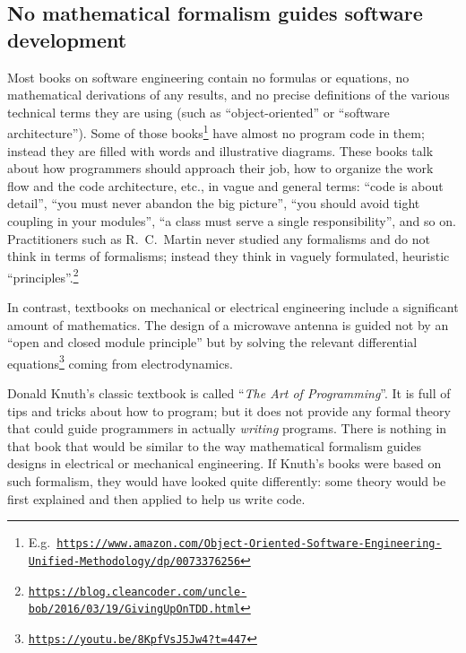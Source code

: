 \subsection{No mathematical formalism guides software development}

Most books on software engineering contain no formulas or equations,
no mathematical derivations of any results, and no precise definitions
of the various technical terms they are using (such as ``object-oriented''
or ``software architecture''). Some of those books\footnote{E.g.~\texttt{\href{https://www.amazon.com/Object-Oriented-Software-Engineering-Unified-Methodology/dp/0073376256}{https://www.amazon.com/Object-Oriented-Software-Engineering-Unified-Methodology/dp/0073376256}}}
have almost no program code in them; instead they are filled with
words and illustrative diagrams. These books talk about how programmers
should approach their job, how to organize the work flow and the code
architecture, etc., in vague and general terms: ``code is about detail'',
``you must never abandon the big picture'', ``you should avoid
tight coupling in your modules'', ``a class must serve a single
responsibility'', and so on. Practitioners such as R.\ C.\ Martin
never studied any formalisms and do not think in terms of formalisms;
instead they think in vaguely formulated, heuristic \textquotedblleft principles\textquotedblright .\footnote{\texttt{\href{https://blog.cleancoder.com/uncle-bob/2016/03/19/GivingUpOnTDD.html}{https://blog.cleancoder.com/uncle-bob/2016/03/19/GivingUpOnTDD.html}}}

In contrast, textbooks on mechanical or electrical engineering include
a significant amount of mathematics. The design of a microwave antenna
is guided not by an ``open and closed module principle'' but by
solving the relevant differential equations\footnote{\texttt{\href{https://youtu.be/8KpfVsJ5Jw4?t=447}{https://youtu.be/8KpfVsJ5Jw4?t=447}}}
coming from electrodynamics.

Donald Knuth's classic textbook is called ``\emph{The Art of Programming}''.
It is full of tips and tricks about how to program; but it does not
provide any formal theory that could guide programmers in actually
\emph{writing} programs. There is nothing in that book that would
be similar to the way mathematical formalism guides designs in electrical
or mechanical engineering. If Knuth's books were based on such formalism,
they would have looked quite differently: some theory would be first
explained and then applied to help us write code.

